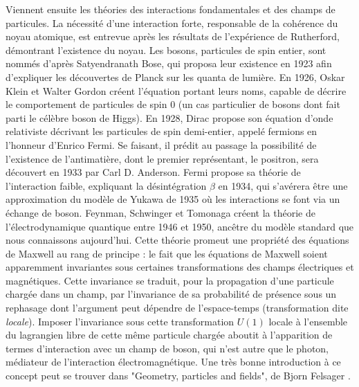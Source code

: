       Viennent ensuite les théories des interactions fondamentales et des champs de particules. La nécessité d'une interaction forte, responsable de la cohérence du noyau atomique, est entrevue après les résultats de l'expérience de Rutherford, démontrant l'existence du noyau. Les bosons, particules de spin entier, sont nommés d'après Satyendranath Bose, qui proposa leur existence en 1923 afin d'expliquer les découvertes de Planck sur les quanta de lumière\cite{Bose1924}. En 1926, Oskar Klein et Walter Gordon\cite{Klein1926,Gordon1926} créent l'équation portant leurs noms, capable de décrire le comportement de particules de spin 0 (un cas particulier de bosons dont fait parti le célèbre boson de Higgs). En 1928, Dirac propose son équation d'onde relativiste décrivant les particules de spin demi-entier, appelé fermions en l'honneur d'Enrico Fermi\cite{Dirac1928}. Se faisant, il prédit au passage la possibilité de l'existence de l'antimatière, dont le premier représentant, le positron, sera découvert en 1933 par Carl D. Anderson\cite{Anderson1933}. Fermi propose sa théorie de l'interaction faible, expliquant la désintégration $\beta$ en 1934\cite{Fermi1934}, qui s'avérera être une approximation du modèle de Yukawa de 1935\cite{Yukawa1935} où les interactions se font via un échange de boson. Feynman, Schwinger et Tomonaga\cite{Tomonaga1946,Schwinger1948,Feynman1998} créent la théorie de l'électrodynamique quantique entre 1946 et 1950, ancêtre du modèle standard que nous connaissons aujourd’hui. Cette théorie promeut une propriété des équations de Maxwell au rang de principe : le fait que les équations de Maxwell soient apparemment invariantes sous certaines transformations des champs électriques et magnétiques. Cette invariance se traduit, pour la propagation d'une particule chargée dans un champ, par l'invariance de sa probabilité de présence sous un rephasage dont l'argument peut dépendre de l'espace-temps (transformation dite \textit{locale}). Imposer l'invariance sous cette transformation $U(1)$ locale à l'ensemble du lagrangien libre de cette même particule chargée aboutit à l'apparition de termes d'interaction avec un champ de boson, qui n'est autre que le photon, médiateur de l'interaction électromagnétique. Une très bonne introduction à ce concept peut se trouver dans "Geometry, particles and fields", de Bjorn Felsager \cite{felsager}.

